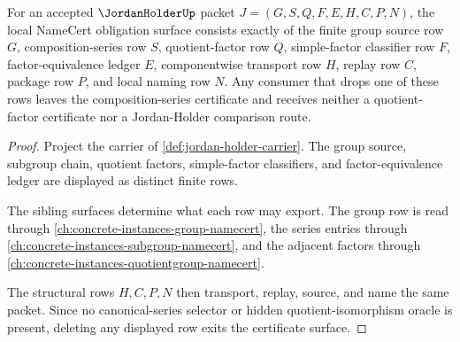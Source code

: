 \begin{theorem}
\label{thm:jordan-holder-namecert-obligation-surface}
For an accepted $\JordanHolderUp$ packet $J=(G,S,Q,F,E,H,C,P,N)$, the local NameCert obligation surface consists exactly of the finite group source row $G$, composition-series row $S$, quotient-factor row $Q$, simple-factor classifier row $F$, factor-equivalence ledger $E$, componentwise transport row $H$, replay row $C$, package row $P$, and local naming row $N$. Any consumer that drops one of these rows leaves the composition-series certificate and receives neither a quotient-factor certificate nor a Jordan-Holder comparison route.
\end{theorem}
\begin{proof}
Project the carrier of \autoref{def:jordan-holder-carrier}. The group source, subgroup chain, quotient factors, simple-factor classifiers, and factor-equivalence ledger are displayed as distinct finite rows.

The sibling surfaces determine what each row may export. The group row is read through \autoref{ch:concrete-instances-group-namecert}, the series entries through \autoref{ch:concrete-instances-subgroup-namecert}, and the adjacent factors through \autoref{ch:concrete-instances-quotientgroup-namecert}.

The structural rows $H,C,P,N$ then transport, replay, source, and name the same packet. Since no canonical-series selector or hidden quotient-isomorphism oracle is present, deleting any displayed row exits the certificate surface.
\end{proof}

